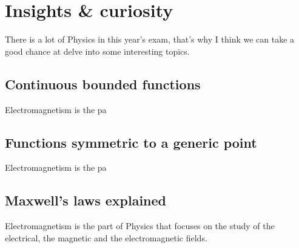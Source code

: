 \chapter[Insights \& curiosity]{Insights \& curiosity}
\label{ch:insights}
There is a lot of Physics in this year's exam, that's why I think we can
take a good chance at delve into some interesting topics.

\section{Continuous bounded functions}
\label{sec:contbound}
Electromagnetism is the pa

\section{Functions symmetric to a generic point}
\label{sec:fsymmcentre}
Electromagnetism is the pa

\section{Maxwell's laws explained}
\label{sec:maxwell}
Electromagnetism is the part of Physics that focuses on the study of the
electrical, the magnetic and the electromagnetic fields.
